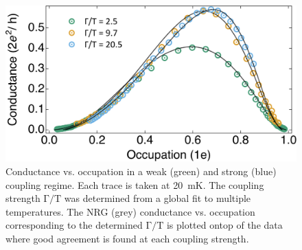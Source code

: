 \begin{figure}[ht]
  \begin{center}
    \includegraphics[width=1\textwidth]{figures/ch3/crop_PosterFiguresMaster.011.png}
    \caption[Conductance vs. Occupation : Varying the coupling strength between the quantum dot and leads]{\label{fig:ch3/cond_occ_couplingstrength} 
    Conductance vs. occupation in a weak (green) and strong (blue) coupling regime. Each trace is taken at \qty{20}{mK}. The coupling strength $\mathrm{\Gamma/T}$ was determined from a global fit to multiple temperatures. The NRG (grey) conductance vs. occupation corresponding to the determined $\mathrm{\Gamma/T}$ is plotted ontop of the data where good agreement is found at each coupling strength.}
  \end{center}
\end{figure}



